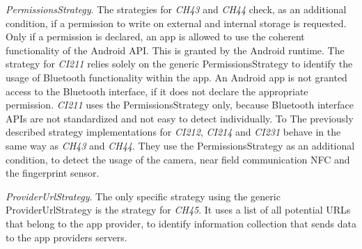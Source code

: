 \textit{PermissionsStrategy}.
The strategies for \textit{CH43} and \textit{CH44} check, as an additional condition, if a permission to write on external and internal storage is requested.
Only if a permission is declared, an app is allowed to use the coherent functionality of the Android API.
This is granted by the Android runtime.
The strategy for \textit{CI211} relies solely on the generic PermissionsStrategy to identify the usage of Bluetooth functionality within the app.
An Android app is not granted access to the Bluetooth interface, if it does not declare the appropriate permission.
\textit{CI211} uses the PermissionsStrategy only, because Bluetooth interface APIs are not standardized and not easy to detect individually.
To 
The previously described strategy implementations for \textit{CI212}, \textit{CI214} and \textit{CI231} behave in the same way as \textit{CH43} and \textit{CH44}.
They use the PermissionsStrategy as an additional condition, to detect the usage of the camera, near field communication \acs{NFC} and the fingerprint sensor.

\textit{ProviderUrlStrategy}.
The only specific strategy using the generic ProviderUrlStrategy is the strategy for \textit{CH45}.
It uses a list of all potential URLs that belong to the app provider, to identify information collection that sends data to the app providers servers.

